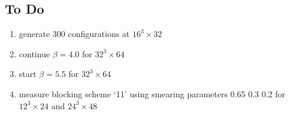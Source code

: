 \documentclass[11pt]{article}
\begin{document}
\subsection{To Do}

\begin{enumerate}
  \item generate 300 configurations at $16^3\times32$
  \item continue $\beta=4.0$ for $32^3\times64$
  \item start $\beta=5.5$ for $32^3\times64$
  \item measure blocking scheme `11' using smearing parameters 0.65 0.3 0.2 for $12^3\times24$ and $24^3\times48$
\end{enumerate}
\end{document}
